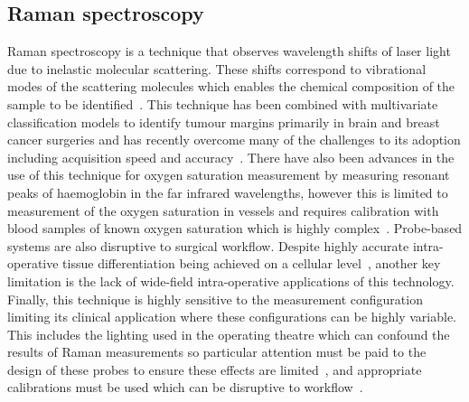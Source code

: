 \subsection{Raman spectroscopy}
Raman spectroscopy is a technique that observes wavelength shifts of laser light due to inelastic molecular scattering. These shifts correspond to vibrational modes of the scattering molecules which enables the chemical composition of the sample to be identified~\citep{Kong2015}. This technique has been combined with multivariate classification models to identify tumour margins primarily in brain and breast cancer surgeries and has recently overcome many of the challenges to its adoption including acquisition speed and accuracy~\citep{Kong2015, Fitzgerald2022}. There have also been advances in the use of this technique for oxygen saturation measurement by measuring resonant peaks of haemoglobin in the far infrared wavelengths, however this is limited to measurement of the oxygen saturation in vessels and requires calibration with blood samples of known oxygen saturation which is highly complex~\citep{TorresFilho2016}. Probe-based systems are also disruptive to surgical workflow. Despite highly accurate intra-operative tissue differentiation being achieved on a cellular level~\citep{Fitzgerald2022}, another key limitation is the lack of wide-field intra-operative applications of this technology. Finally, this technique is highly sensitive to the measurement configuration limiting its clinical application where these configurations can be highly variable. This includes the lighting used in the operating theatre which can confound the results of Raman measurements so particular attention must be paid to the design of these probes to ensure these effects are limited~\citep{Horsnell2016}, and appropriate calibrations must be used which can be disruptive to workflow~\citep{TorresFilho2016}.

